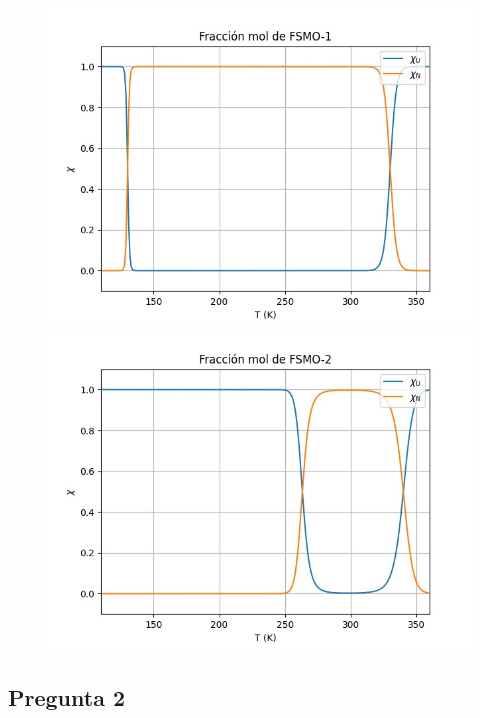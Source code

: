 \documentclass{article}
\begin{document}
\begin{figure}[h!]
\begin{minipage}[b]{0.45\textwidth}
          \includegraphics[scale=0.5]{fsmo12.jpeg}
        \end{minipage}
        \begin{minipage}[b]{0.45\textwidth}
            \centering
          \includegraphics[scale=0.5]{fsmo22.jpeg}
        \end{minipage}
    \end{figure}
    

    \subsection*{Pregunta 2}
\end{document}
